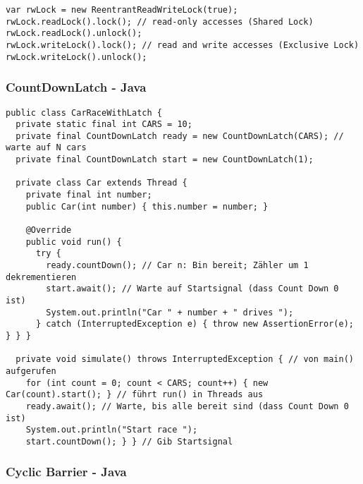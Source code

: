 \begin{lstlisting}
var rwLock = new ReentrantReadWriteLock(true);
rwLock.readLock().lock(); // read-only accesses (Shared Lock)
rwLock.readLock().unlock();
rwLock.writeLock().lock(); // read and write accesses (Exclusive Lock)
rwLock.writeLock().unlock();
\end{lstlisting}

\subsubsection{CountDownLatch - Java}

\begin{lstlisting}
public class CarRaceWithLatch {
  private static final int CARS = 10;
  private final CountDownLatch ready = new CountDownLatch(CARS); // warte auf N cars
  private final CountDownLatch start = new CountDownLatch(1);

  private class Car extends Thread {
  	private final int number;
  	public Car(int number) { this.number = number; }

  	@Override
  	public void run() {
  	  try {
  	  	ready.countDown(); // Car n: Bin bereit; Zähler um 1 dekrementieren
  	  	start.await(); // Warte auf Startsignal (dass Count Down 0 ist)
  	  	System.out.println("Car " + number + " drives ");
  	  } catch (InterruptedException e) { throw new AssertionError(e); } } }

  private void simulate() throws InterruptedException { // von main() aufgerufen
  	for (int count = 0; count < CARS; count++) { new Car(count).start(); } // führt run() in Threads aus
  	ready.await(); // Warte, bis alle bereit sind (dass Count Down 0 ist)
  	System.out.println("Start race ");
  	start.countDown(); } } // Gib Startsignal
\end{lstlisting}

\subsubsection{Cyclic Barrier - Java}

